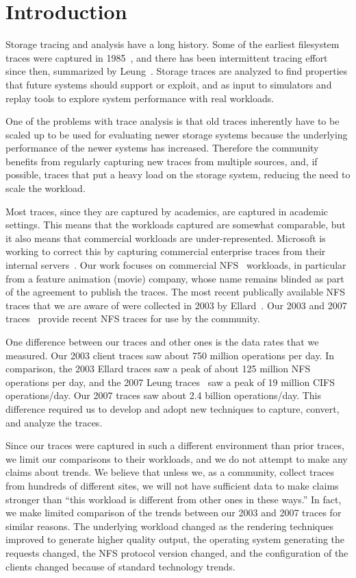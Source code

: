 \section{Introduction}

Storage tracing and analysis have a long history.  Some of the earliest
filesystem traces were captured in 1985~\cite{ousterhout85}, and there
has been intermittent tracing effort since then, summarized by
Leung~\cite{LeungUsenix08}.  Storage traces are
analyzed to find properties that future systems should support or
exploit, and as input to simulators and replay tools to explore system
performance with real workloads.

One of the problems
with trace analysis is that old traces inherently have to be scaled up
to be used for evaluating newer storage systems because the
underlying performance of the newer systems has increased.  Therefore
the community benefits from regularly capturing new traces from multiple
sources, and,  if possible, traces that put a heavy load on the storage
system, reducing the need to scale the workload.

Most traces, since they are captured by academics, are captured in
academic settings.  This means that the workloads captured are
somewhat comparable, but it also means that commercial workloads are
under-represented.  Microsoft is working to correct this by capturing
commercial enterprise traces from their internal
servers~\cite{snia-iotta-microsoft}.  Our work focuses on commercial
NFS~\cite{rfc1094nfs,rfc1813nfsv3,Pawlowski94nfs3} workloads, in
particular from a feature animation (movie) company, whose name 
remains blinded as part of the agreement to publish the
traces.  The most recent publically available NFS traces that we are aware of
were collected in 2003 by Ellard~\cite{EllardLisa03}.  Our 2003 and
2007 traces~\cite{animation-bear-traces} provide recent NFS traces for
use by the community.

One difference between our traces and other ones is the data rates
that we measured.  Our 2003 client traces saw about 750 million
operations per day.  In comparison, the 2003 Ellard
traces saw a peak of about 125 million NFS
operations per day, and the 2007 Leung traces~\cite{LeungUsenix08}
saw a peak of 19 million CIFS operations/day.  Our 2007 traces saw
about 2.4 billion operations/day.  This difference required us to
develop and adopt new techniques to capture, convert, and analyze the
traces.

Since our traces were captured in such a different environment than
prior traces, we limit our comparisons to their workloads, and we
do not attempt to make any claims about trends.  We believe that
unless we, as a community, collect traces from hundreds of different
sites, we will not have sufficient data to make claims stronger than
``this workload is different from other ones in these ways.''  In
fact, we make limited comparison of the trends between our 2003 and
2007 traces for similar reasons.  The underlying workload changed
as the rendering techniques improved to generate higher quality output,
the operating system generating the requests changed, the NFS
protocol version changed, and the configuration of the clients 
changed because of standard technology trends.


